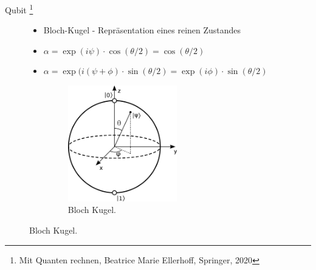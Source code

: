 \documentclass[aspectratio=1610, 9pt]{beamer}
\begin{document}
\begin{frame}{Qubit \footnote[200]{Mit Quanten rechnen, Beatrice Marie Ellerhoff, Springer, 2020}}
\begin{figure}
\begin{minipage}{0.49\textwidth}
\begin{itemize}
        \item Bloch-Kugel - Repräsentation eines reinen Zustandes
        \item[] $\alpha = \exp(i\psi) \cdot \cos(\theta/2) = \cos(\theta/2)$
        \item[] $\alpha = \exp(i(\psi+\phi) \cdot \sin(\theta/2) = \exp(i\phi) \cdot \sin(\theta/2)$
        \begin{figure}
          \includegraphics[width=0.56\textwidth]{images/Bloch.png}
          \caption{Bloch Kugel. \footnotemark[100]}
        \end{figure}
      \end{itemize}
    \end{minipage}
  \end{figure}
\end{frame}
\end{document}

